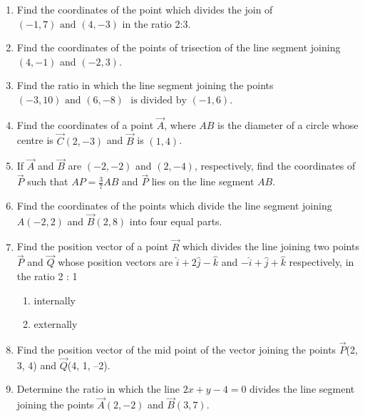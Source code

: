 \begin{enumerate}[label=\thesubsection.\arabic*,ref=\thesubsection.\theenumi]
\item Find the coordinates of the point which divides the join of $(-1,7) \text{ and } (4,-3)$ in the ratio 2:3.
	\\
		\solution
	
\item Find the coordinates of the points of trisection of the line segment joining $(4,-1)$  and  $(-2,3)$.
	\\
		\solution
	
\item Find the ratio in which the line segment joining the points $(-3,10) \text{ and } (6,-8)$ $\text{ is divided by } (-1,6)$.
	\\
		\solution
	
\item Find the coordinates of a point $\vec{A}$, where $AB$ is the diameter of a circle whose centre is $ \vec{C}(2,-3)$  and  $\vec{B}$ is $(1,4)$.
	\\
		\solution
	
\item If $\vec{A}$ and  $\vec{B}$ are $(-2,-2)$ and  $(2,-4)$, respectively, find the coordinates of $\vec{P}$ such that $AP= \frac {3}{7}AB$  and $ \vec{P}$ lies on the line segment $AB$.
	\\
		\solution
	
\item Find the coordinates of the points which divide the line segment joining $A(-2,2)$  and  $\vec{B}(2,8)$ into four equal parts.
	\\
		\solution
	
\item Find the position vector of a point $\vec{R}$ which divides the line joining two points $\vec{P}$
and $\vec{Q}$ whose position vectors are $\hat{i}+2\hat{j}-\hat{k}$ and $-\hat{i}+\hat{j}+\hat{k}$ respectively, in the
ratio 2 : 1
\begin{enumerate}
    \item  internally
    \item  externally
\end{enumerate}
\solution
		
\item Find the position vector of the mid point of the vector joining the points $\vec{P}$(2, 3, 4)
and $\vec{Q}$(4, 1, –2).
\\
\solution
		
\item Determine the ratio in which the line $2x+y  - 4=0$ divides the line segment joining the points  $\vec{A}(2, - 2)$  and  $\vec{B}(3, 7)$.

\end{enumerate}
